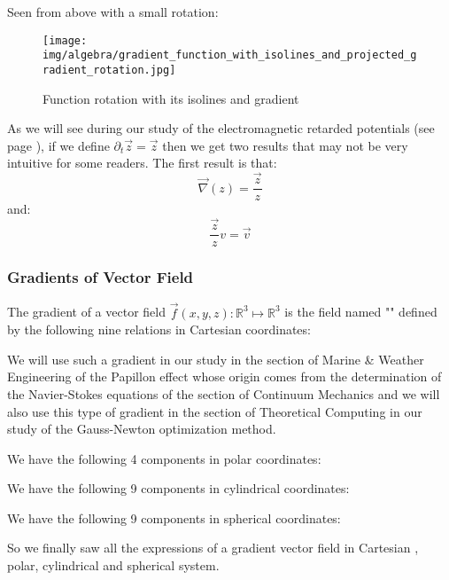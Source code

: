 	\pagebreak
	\begin{tcolorbox}[colframe=black,colback=white,sharp corners]
	Seen from above with a small rotation:\\
	\begin{figure}[H]
		\centering
		\texttt{[image: img/algebra/gradient\_function\_with\_isolines\_and\_projected\_gradient\_rotation.jpg]}
		\caption[]{Function rotation with its isolines and gradient}
	\end{figure}
	\end{tcolorbox}
	
	\begin{tcolorbox}[title=Remark,colframe=black,arc=10pt]
	As we will see during our study of the electromagnetic retarded potentials (see page \pageref{linear wiechard potentials}), if we define $\partial_t \vec{z}=\vec{z}$ then we get two results that may not be very intuitive for some readers. The first result is that:
	$$\vec{\nabla}(z)=\dfrac{\vec{z}}{z}$$
	and:
	$$\dfrac{\vec{z}}{z}v=\vec{v}$$
	\end{tcolorbox}
	
	\subsubsection{Gradients of Vector Field}\label{gradient of vector field}
	The gradient of a vector field $\vec{f}(x,y,z): \mathbb{R}^3\mapsto\mathbb{R}^3$ is the field named "" defined by the following nine relations in Cartesian coordinates:
	 
	 We will use such a gradient in our study in the section of Marine \& Weather Engineering of the Papillon effect whose origin comes from the determination of the Navier-Stokes equations of the section of Continuum Mechanics and we will also use this type of gradient in the section of Theoretical Computing in our study of the Gauss-Newton optimization method.
	
	We have the following 4 components in polar coordinates:
	 
	We have the following 9 components in cylindrical coordinates:
	 
	We have the following 9 components in spherical coordinates:
	 
	 So we finally saw all the expressions of a gradient vector field in Cartesian , polar, cylindrical and spherical system.
	 
